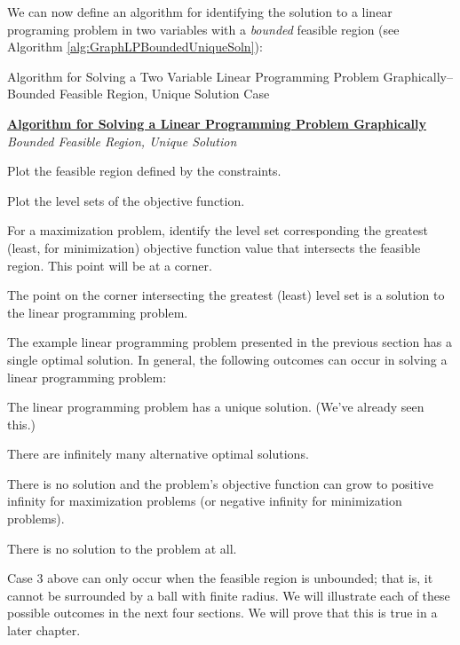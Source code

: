 We can now define an algorithm for identifying the solution to a linear programing problem in two variables with a \textit{bounded} feasible region (see Algorithm \ref{alg:GraphLPBoundedUniqueSoln}): 
\begin{algorithm}
\caption{Algorithm for Solving a Two Variable Linear Programming Problem Graphically--Bounded Feasible Region, Unique Solution Case}
\label{alg:GraphLPBoundedUniqueSoln}
\begin{center}
\begin{minipage}[t]{\textwidth-1em}
\underline{\textbf{Algorithm for Solving a Linear Programming Problem Graphically}}\\
\textit{Bounded Feasible Region, Unique Solution}
\begin{enumerate*}
\item Plot the feasible region defined by the constraints.
\item Plot the level sets of the objective function.
\item For a maximization problem, identify the level set corresponding the greatest (least, for minimization) objective function value that intersects the feasible region. This point will be at a corner. 
\item The point on the corner intersecting the greatest (least) level set is a solution to the linear programming problem.  
\end{enumerate*}
\end{minipage}
\end{center}
\end{algorithm}

The example linear programming problem presented in the previous section has a single optimal solution. In general, the following outcomes can occur in solving a linear programming problem: 
\begin{enumerate*}
\item The linear programming problem has a unique solution. (We've already seen this.)
\item There are infinitely many alternative optimal solutions.
\item There is no solution and the problem's objective function can grow to positive infinity for maximization problems (or negative infinity for minimization problems). 
\item There is no solution to the problem at all. 
\end{enumerate*}

Case 3 above can only occur when the feasible region is unbounded; that is, it cannot be surrounded by a ball with finite radius. We will illustrate each of these possible outcomes in the next four sections. We will prove that this is true in a later chapter.



